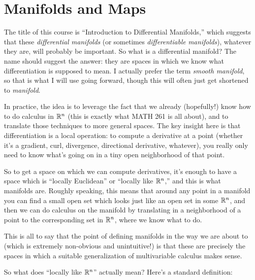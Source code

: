 
\section{Manifolds and Maps}

The title of this course is ``Introduction to Differential Manifolds,'' which suggests that these \emph{differential manifolds} (or sometimes \emph{differentiable manifolds}), whatever they are, will probably be important. So what is a differential manifold? The name should suggest the answer: they are spaces in which we know what differentiation is supposed to mean. I actually prefer the term \emph{smooth manifold}, so that is what I will use going forward, though this will often just get shortened to \emph{manifold}.

In practice, the idea is to leverage the fact that we already (hopefully!) know how to do calculus in $\mathbb{R}^n$ (this is exactly what MATH 261 is all about), and to translate those techniques to more general spaces. The key insight here is that differentiation is a local operation: to compute a derivative at a point (whether it's a gradient, curl, divergence, directional derivative, whatever), you really only need to know what's going on in a tiny open neighborhood of that point. 

So to get a space on which we can compute derivatives, it's enough to have a space which is ``locally Euclidean'' or ``locally like $\mathbb{R}^n$,'' and this is what manifolds are. Roughly speaking, this means that around any point in a manifold you can find a small open set which looks just like an open set in some $\mathbb{R}^n$, and then we can do calculus on the manifold by translating in a neighborhood of a point to the corresponding set in $\mathbb{R}^n$, where we know what to do.

This is all to say that the point of defining manifolds in the way we are about to (which is extremely non-obvious and unintuitive!) is that these are precisely the spaces in which a suitable generalization of multivariable calculus makes sense.

So what does ``locally like $\mathbb{R}^n$'' actually mean? Here's a standard definition:

